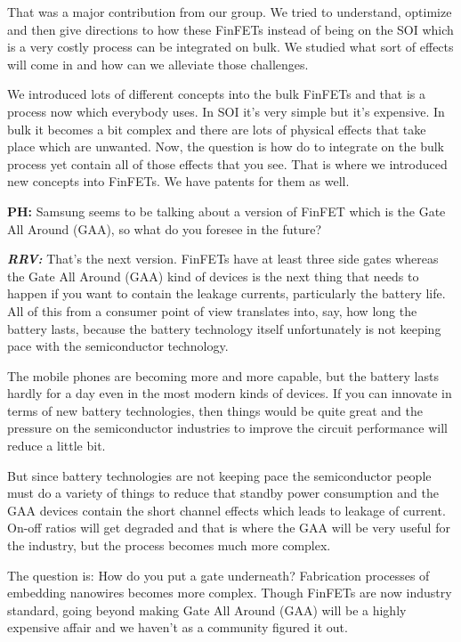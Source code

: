 That was a major contribution from our group. We tried to understand, optimize and then give directions to how these FinFETs instead of being on the SOI which is a very costly process can be integrated on bulk. We studied what sort of effects will come in and how can we alleviate those challenges.

We introduced lots of different concepts into the bulk FinFETs and that is a process now which everybody uses. In SOI it’s very simple but it’s expensive. In bulk it becomes a bit complex and there are lots of physical effects that take place which are unwanted. Now, the question is how do to integrate on the bulk process yet contain all of those effects that you see. That is where we introduced new concepts into FinFETs. We have patents for them as well.

\textbf{PH:} Samsung seems to be talking about a version of FinFET which is the Gate All Around (GAA), so what do you foresee in the future?

\textbf{\textit{RRV: }} That’s the next version. FinFETs have at least three side gates whereas the Gate All Around (GAA) kind of devices is the next thing that needs to happen if you want to contain the leakage currents, particularly the battery life. All of this from a consumer point of view translates into, say, how long the battery lasts, because the battery technology itself unfortunately is not keeping pace with the semiconductor technology.
 
 The mobile phones are becoming more and more capable, but the battery lasts hardly for a day even in the most modern kinds of devices. If you can innovate in terms of new battery technologies, then things would be quite great and the pressure on the semiconductor industries to improve the circuit performance will reduce a little bit.
 
 But since battery technologies are not keeping pace the semiconductor people must do a variety of things to reduce that standby power consumption and the GAA devices contain the short channel effects which leads to leakage of current. On-off ratios will get degraded and that is where the GAA will be very useful for the industry, but the process becomes much more complex.
 
 The question is: How do you put a gate underneath? Fabrication processes of embedding nanowires becomes more complex. Though FinFETs are now industry standard, going beyond making Gate All Around (GAA) will be a highly expensive affair and we haven’t as a community figured it out.
 

